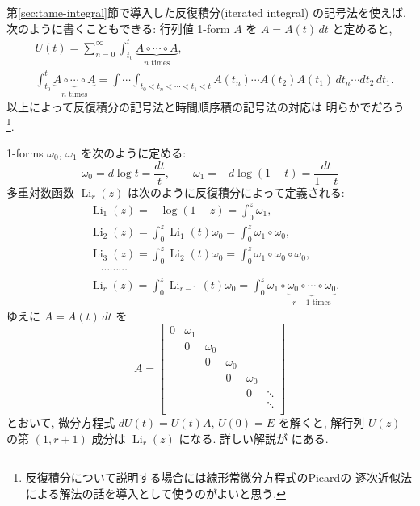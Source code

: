 \documentclass[12pt,twoside]{jarticle}
\theoremstyle{definition} %
\theoremstyle{definition} %
\theoremstyle{definition} %
\numberwithin{theorem}{section}
\numberwithin{equation}{section}
\numberwithin{figure}{section}
\numberwithin{table}{section}
\newcommand\secref[1]{第\ref{#1}節}
\newcommand\Li{\operatorname{Li}}
\begin{document}
\secref{sec:tame-integral}で導入した反復積分(iterated integral)
の記号法を使えば, 次のように書くこともできる: 
行列値 1-form $A$ を $A = A(t)\,dt$ と定めると,
\begin{align*}
&
U(t)
= \sum_{n=0}^\infty
\int_{t_0}^t \underbrace{A\circ\cdots\circ A}_{\text{$n$ times}},
\\ &
\int_{t_0}^t \underbrace{A\circ\cdots\circ A}_{\text{$n$ times}}
=
\int\!\cdots\!\int_{t_0<t_n<\cdots<t_1<t}
A(t_n)\cdots A(t_2)A(t_1) \,dt_n\cdots dt_2\,dt_1.
\end{align*}
以上によって反復積分の記号法と時間順序積の記号法の対応は
明らかでだろう%
\footnote{反復積分について説明する場合には線形常微分方程式のPicardの
逐次近似法による解法の話を導入として使うのがよいと思う.}.


1-forms $\omega_0$, $\omega_1$ を次のように定める:
\[
\omega_0 = d\log t = \frac{dt}{t}, \qquad
\omega_1 = -d\log(1-t) = \frac{dt}{1-t}
\]
多重対数函数 $\Li_r(z)$ は次のように反復積分によって定義される:
\begin{align*}
&
\Li_1(z) = -\log(1-z) = \int_0^z \omega_1,
\\ &
\Li_2(z) = \int_0^z \Li_1(t)\omega_0 = \int_0^z \omega_1\circ\omega_0,
\\ &
\Li_3(z) = \int_0^z \Li_2(t)\omega_0 = \int_0^z \omega_1\circ\omega_0\circ\omega_0,
\\ &
\quad \cdots\cdots\cdots
\\ &
\Li_r(z) = \int_0^z \Li_{r-1}(t)\omega_0
= \int_0^z \omega_1\circ
\underbrace{\omega_0\circ\cdots\circ\omega_0}_{\text{$r-1$ times}}.
\end{align*}
ゆえに $A=A(t)\,dt$ を
\[
A =
\begin{bmatrix}
0 & \omega_1 &          &          &          & \\
  & 0        & \omega_0 &          &          & \\
  &          & 0        & \omega_0 &          & \\
  &          &          & 0        & \omega_0 & \\
  &          &          &          & 0        & \ddots \\
  &          &          &          &          & \ddots \\
\end{bmatrix}
\]
とおいて, 微分方程式 $dU(t)=U(t)A$, $U(0)=E$ を解くと, 
解行列 $U(z)$ の第 $(1,r+1)$ 成分は $\Li_r(z)$ になる.
詳しい解説が \cite{hain} にある.

\end{document}
